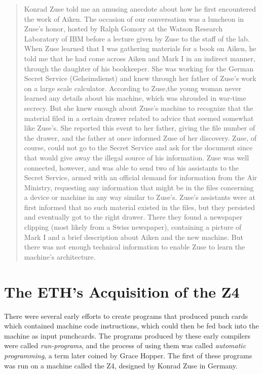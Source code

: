 \begin{quotation}
	Konrad Zuse told me an amusing anecdote about how he first
	encountered the work of Aiken. The occasion of our conversation was
	a luncheon in Zuse's honor, hosted by Ralph Gomory at the Watson
	Research Laboratory of IBM before a lecture given by Zuse to the
	staff of the lab. When Zuse learned that I was gathering materials
	for a book on Aiken, he told me that he had come across Aiken and
	Mark I in an indirect manner, through the daughter of his
	bookkeeper. She was working for the German Secret
	Service (Geheimdienst) and knew through her father of Zuse's work on
	a large scale calculator. According to Zuse,the young woman never
	learned any details about his machine, which was shrouded in
	war-time secrecy. But she knew enough about Zuse's machine to
	recognize that the material filed in a certain drawer related to
	advice that seemed somewhat like Zuse's. She reported this event
	to her father, giving the file number of the drawer, and the father
	at once informed Zuse of her discovery. Zuse, of course, could not
	go to the Secret Service and ask for the document since that would
	give away the illegal source of his information. Zuse was well
	connected, however, and was able to send two of his assistants to
	the Secret Service, armed with an official demand for information
	from the Air Ministry, requesting any information that might be in
	the files concerning a device or machine in any way similar
	to Zuse's. Zuse's assistants were at first informed that no such
	material existed in the files, but they persisted and eventually got
	to the right drawer. There they found a newspaper clipping (most
	likely from a Swiss newspaper), containing a picture of Mark I and a
	brief description about Aiken and the new machine. But there was not
	enough technical information to enable Zuse to learn the machine's
	architecture.
\end{quotation}

\section{The ETH's Acquisition of the Z4}

There were several early efforts to create programs that produced punch
cards which contained machine code instructions, which could then be fed back
into the machine as input punchcards. The programs produced by these early
compilers were called \textit{run-programs}, and the process of using them was
called \textit{automatic programming}, a term later coined by Grace Hopper. The
first of these programs was run on a machine called the Z4, designed by Konrad
Zuse in Germany.

